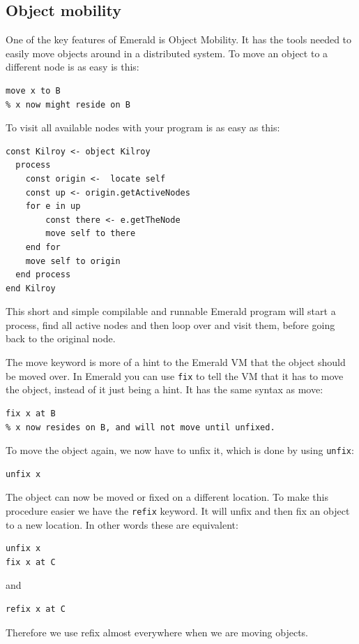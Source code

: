 \subsection{Object mobility}
One of the key features of Emerald is Object Mobility. It has the tools needed to easily move objects around in a distributed system. To move an object to a different node is as easy is this:
\begin{lstlisting}[language=emerald]
% x is created and resides on A
move x to B
% x now might reside on B
\end{lstlisting}
To visit all available nodes with your program is as easy as this\cite{noauthor_emerald_nodate}:
\begin{lstlisting}[language=emerald]
const Kilroy <- object Kilroy
  process
    const origin <-  locate self
    const up <- origin.getActiveNodes
    for e in up
      	const there <- e.getTheNode
      	move self to there
    end for
    move self to origin
  end process
end Kilroy
\end{lstlisting}
This short and simple compilable and runnable Emerald program will start a process, find all active nodes and then loop over and visit them, before going back to the original node.

The move keyword is more of a hint to the Emerald VM that the object should be moved over. In Emerald you can use \verb|fix| to tell the VM that it has to move the object, instead of it just being a hint. It has the same syntax as move:
\begin{lstlisting}[language=emerald]
% x is created and resides on A
fix x at B
% x now resides on B, and will not move until unfixed.
\end{lstlisting}
To move the object again, we now have to unfix it, which is done by using \verb|unfix|:
\begin{lstlisting}[language=emerald]
unfix x
\end{lstlisting}
The object can now be moved or fixed on a different location. To make this procedure easier we have the \verb|refix| keyword. It will unfix and then fix an object to a new location. In other words these are equivalent:
\begin{lstlisting}[language=emerald]
unfix x
fix x at C
\end{lstlisting}
and
\begin{lstlisting}[language=emerald]
refix x at C
\end{lstlisting}
Therefore we use refix almost everywhere when we are moving objects. 



